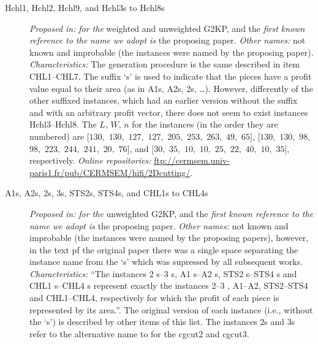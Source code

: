 \documentclass[ppgc,tese,english,formais,babel]{iiufrgs}
\begin{document}
\begin{description}
\item [Hchl1, Hchl2, Hchl9, and Hchl3s to Hchl8s] \emph{Proposed in:} \citet{cung:2000} \emph{for the} weighted and unweighted G2KP, and the \emph{first known reference to the name we adopt is} the proposing paper. \emph{Other names:} not known and improbable (the instances were named by the proposing paper). \emph{Characteristics: } The generation procedure is the same described in item CHL1--CHL7. The suffix `s' is used to indicate that the pieces have a profit value equal to their area (as in A1s, A2s, 2s, \dots). However, differently of the other suffixed instances, which had an earlier version without the suffix and with an arbitrary profit vector, there does not seem to exist instances Hchl3--Hchl8. The \(L\), \(W\), \(n\) for the instances (in the order they are numbered) are \([130,\) \(130,\) \(127,\) \(127,\) \(205,\) \(253,\) \(263,\) \(49,\) \(65]\), \([130,\) \(130,\) \(98,\) \(98,\) \(223,\) \(244,\) \(241,\) \(20,\) \(76]\), and \([30,\) \(35,\) \(10,\) \(10,\) \(25,\) \(22,\) \(40,\) \(10,\) \(35]\), respectively. \emph{Online repositories:} \url{ftp://cermsem.univ-paris1.fr/pub/CERMSEM/hifi/2Dcutting/}.
\item [A1s, A2s, 2s, 3s, STS2s, STS4s, and CHL1s to CHL4s] \emph{Proposed in:} \citet{cung:2000} \emph{for the} unweighted G2KP, and the \emph{first known reference to the name we adopt is} the proposing paper. \emph{Other names:} not known and improbable (the instances were named by the proposing papers), however, in the text pf the original paper there was a single space separating the instance name from the `s' which was supressed by all subsequent works. \emph{Characteristics: } ``The instances 2 s--3 s, A1 s--A2 s, STS2 s--STS4 s and CHL1 s--CHL4 s represent exactly the instances 2--3 , A1--A2, STS2--STS4 and CHL1--CHL4, respectively for which the profit of each piece is represented by its area.''. \citep{cung:2000} The original version of each instance (i.e., without the `s') is described by other items of this list. The instances 2s and 3s refer to the alternative name to for the cgcut2 and cgcut3.

\end{description}
\end{document}
